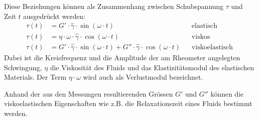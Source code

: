 Diese Beziehungen können als Zusammenhang zwischen Schubspannung $\tau$ und Zeit $t$ ausgedrückt werden:
\begin{align}
    \label{eq:schwingungsmodi}
    \tau\left( t \right)&=G'\cdot\hat{\gamma}\cdot \sin\left( \omega\cdot t \right) && \text{elastisch}\\
    \tau\left( t \right)&=\eta\cdot\omega\cdot\hat{\gamma}\cdot \cos\left( \omega\cdot t \right)&& \text{viskos}\\
    \tau\left( t \right)&=G'\cdot\hat{\gamma}\cdot \sin\left( \omega\cdot t \right)+G''\cdot\hat{\gamma}\cdot \cos\left( \omega\cdot t \right)&& \text{viskoelastisch}
\end{align}
Dabei ist  die Kreisfrequenz und  die Amplitude der am Rheometer angelegten Schwingung, $\eta$ die Viskosität des Fluids und  das Elastizitätsmodul des elastischen Materials. Der Term $\eta\cdot\omega$ wird auch als Verlustmodul  bezeichnet.

Anhand der aus den Messungen resultierenden Grössen $G'$ und $G''$ können die viskoelastischen Eigenschaften wie z.B. die Relaxationszeit eines Fluids bestimmt werden.

